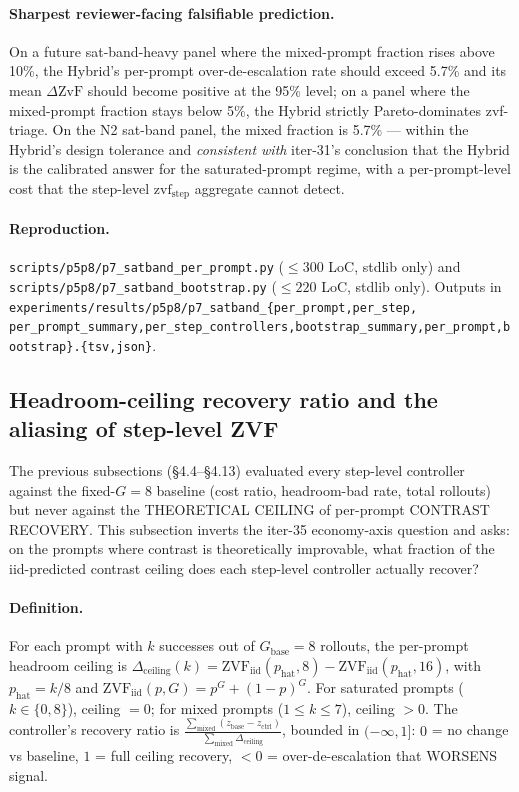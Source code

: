\paragraph{Sharpest reviewer-facing falsifiable prediction.}
On a future sat-band-heavy panel where the mixed-prompt fraction
rises above 10\%, the Hybrid's per-prompt over-de-escalation rate
should exceed 5.7\% and its mean $\Delta\mathrm{ZvF}$ should become
positive at the 95\% level; on a panel where the mixed-prompt fraction
stays below 5\%, the Hybrid strictly Pareto-dominates zvf-triage.
On the N2 sat-band panel, the mixed fraction is 5.7\% --- within the
Hybrid's design tolerance and \emph{consistent with} iter-31's
conclusion that the Hybrid is the calibrated answer for the
saturated-prompt regime, with a per-prompt-level cost that the
step-level $\mathrm{zvf}_\text{step}$ aggregate cannot detect.

\paragraph{Reproduction.}
\texttt{scripts/p5p8/p7\_satband\_per\_prompt.py}
($\leq 300$ LoC, stdlib only) and
\texttt{scripts/p5p8/p7\_satband\_bootstrap.py}
($\leq 220$ LoC, stdlib only). Outputs in
\texttt{experiments/results/p5p8/p7\_satband\_\{per\_prompt,per\_step,
per\_prompt\_summary,per\_step\_controllers,bootstrap\_summary,per\_prompt,bootstrap\}.\{tsv,json\}}.

\subsection{Headroom-ceiling recovery ratio and the aliasing of step-level ZVF}
\label{sec:p7-headroom-recovery}

The previous subsections (§4.4--§4.13) evaluated every step-level
controller against the fixed-$G{=}8$ baseline (cost ratio,
headroom-bad rate, total rollouts) but never against the THEORETICAL
CEILING of per-prompt CONTRAST RECOVERY. This subsection inverts the
iter-35 economy-axis question and asks: on the prompts where contrast
is theoretically improvable, what fraction of the iid-predicted
contrast ceiling does each step-level controller actually recover?

\paragraph{Definition.} For each prompt with $k$ successes out of
$G_{\mathrm{base}}{=}8$ rollouts, the per-prompt headroom ceiling is
$\Delta_{\mathrm{ceiling}}(k) = \mathrm{ZVF}_{\mathrm{iid}}(p_{\mathrm{hat}}, 8)
- \mathrm{ZVF}_{\mathrm{iid}}(p_{\mathrm{hat}}, 16)$, with
$p_{\mathrm{hat}}{=}k/8$ and
$\mathrm{ZVF}_{\mathrm{iid}}(p, G) = p^G + (1-p)^G$. For saturated
prompts ($k \in \{0, 8\}$), ceiling $= 0$; for mixed prompts
($1 \le k \le 7$), ceiling $> 0$. The controller's recovery ratio is
$\frac{\sum_{\mathrm{mixed}}(z_{\mathrm{base}} - z_{\mathrm{ctrl}})}{\sum_{\mathrm{mixed}}\Delta_{\mathrm{ceiling}}}$,
bounded in $(-\infty, 1]$: $0$ = no change vs baseline, $1$ = full
ceiling recovery, $< 0$ = over-de-escalation that WORSENS signal.

